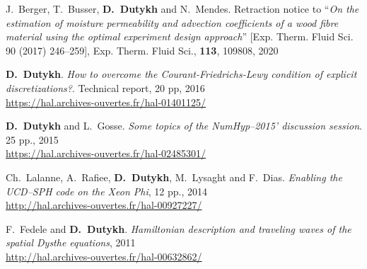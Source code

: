 \begin{etaremune}


  
  \item J.~Berger, T.~Busser, \textbf{D.~Dutykh} and N.~Mendes. Retraction notice to ``\textit{On the estimation of moisture permeability and advection coefficients of a wood fibre material using the optimal experiment design approach}'' [Exp. Therm. Fluid Sci. 90 (2017) 246--259], Exp. Therm. Fluid Sci., \textbf{113}, 109808, 2020 %



  \item \textbf{D.~Dutykh}. \textit{How to overcome the Courant-Friedrichs-Lewy condition of explicit discretizations?}. Technical report, 20 pp, 2016 \\ %
  \url{https://hal.archives-ouvertes.fr/hal-01401125/}
  


  \item \textbf{D.~Dutykh} and L.~Gosse. \textit{Some topics of the NumHyp--2015' discussion session}. 25 pp., 2015 \\ %
  \url{https://hal.archives-ouvertes.fr/hal-02485301/}
  

  
  \item Ch.~Lalanne, A.~Rafiee, \textbf{D.~Dutykh}, M.~Lysaght and F.~Dias. \textit{Enabling the UCD--SPH code on the Xeon Phi}, 12 pp., 2014 \\ %
  \url{http://hal.archives-ouvertes.fr/hal-00927227/}
  


  \item F.~Fedele and \textbf{D.~Dutykh}. \textit{Hamiltonian description and traveling waves of the spatial Dysthe equations}, 2011 \\ %
  \url{http://hal.archives-ouvertes.fr/hal-00632862/}
  

\end{etaremune}
